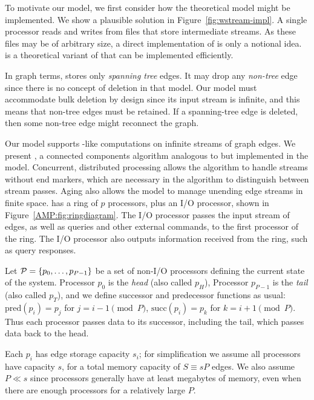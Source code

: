 To motivate our \XStream model, we first consider how the theoretical
\WStream model might be implemented.  We show a plausible solution
in Figure~\ref{fig:wstream-impl}.  A single processor reads and writes
from files that store intermediate streams.  As these files may be of
arbitrary size, a direct implementation of \WStream is only a notional
idea.  \XStream is a theoretical variant of \WStream that can be
implemented efficiently.

In graph terms, \WStream stores only \emph{spanning tree} edges.  It
may drop any \emph{non-tree} edge since there is no concept of deletion
in that model.  Our \XStream model must accommodate bulk deletion by design
since
its input stream is infinite, and this means that non-tree edges must
be retained.  If a spanning-tree edge is deleted, then some non-tree edge
might reconnect the graph.

Our \XStream model supports \WStreamns-like computations on infinite
streams of graph edges.  We present \XSCCns, a connected components algorithm
analogous to \DFR but implemented in the \XStream model.
Concurrent, distributed processing allows the \XSCC algorithm to handle streams without end markers, which are necessary in the \DFR algorithm to distinguish between stream passes. Aging also allows the \XStream model to manage unending edge streams in 
finite space.
\XStream has a ring of $p$ processors, plus an I/O processor, shown in Figure~\ref{AMP:fig:ringdiagram}. The I/O processor passes the input stream of edges, as well as queries and other external commands, to the first processor of the ring. The I/O processor also outputs information received from the ring, such as query responses.

Let ${\cal P} = \{p_0, \ldots, p_{P-1}\}$ be a set of non-I/O processors defining the
current state of the system. 
Processor $p_0$ is the \emph{head} (also called $p_H$), Processor
$p_{P-1}$ is the \emph{tail} (also called $p_T$), and we define 
successor and predecessor functions
as usual: $\mbox{pred}(p_i) = p_{j}$ for $j =i-1 \pmod{P}$, $\mbox{succ}(p_i) = p_{k}$ for $k = i+1\pmod{P}$. 
Thus each processor passes data to its successor, including the tail,
which passes data back to the head. 

Each $p_i$ has edge storage capacity $s_i$; for simplification we assume all processors have capacity $s$, for a total memory capacity of $S \equiv sP$ edges. We also assume $P \ll s$ since processors generally have at least megabytes of memory, even when there are enough processors for a relatively large $P$.



